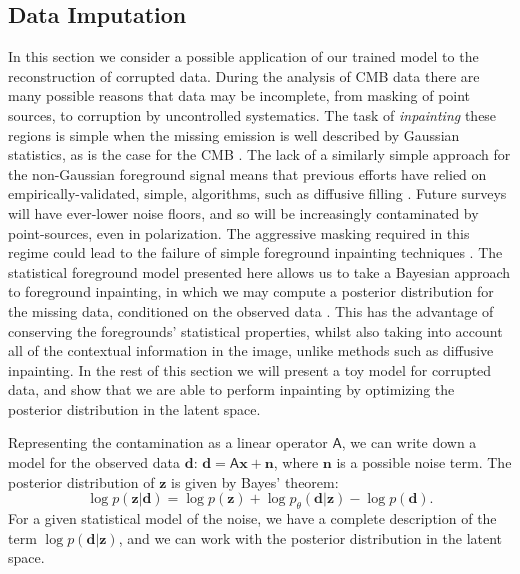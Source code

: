 \documentclass[fleqn,usenatbib]{mnras}
\begin{document}
\subsection{Data Imputation}
\label{sec:imputation} 
In this section we consider a possible application of our trained model to the reconstruction of corrupted data. During the analysis of CMB data there are many possible reasons that data may be incomplete, from masking of point sources, to corruption by uncontrolled systematics. The task of \emph{inpainting} these regions is simple when the missing emission is well described by Gaussian statistics, as is the case for the CMB \citep{bucher/louis:2012}. The lack of a similarly simple approach for the non-Gaussian foreground signal means that previous efforts have relied on empirically-validated, simple, algorithms, such as diffusive filling \citep{bucher/etal:2016}. Future surveys will have ever-lower noise floors, and so will be increasingly contaminated by point-sources, even in polarization. The aggressive masking required in this regime could lead to the failure of simple foreground inpainting techniques \citep{puglisi/bai:2020}. The statistical foreground model presented here allows us to take a Bayesian approach to foreground inpainting, in which we may compute a posterior distribution for the missing data, conditioned on the observed data \citep{bohm/seljak:2019}. This has the advantage of conserving the foregrounds' statistical properties, whilst also taking into account all of the contextual information in the image, unlike methods such as diffusive inpainting. In the rest of this section we will present a toy model for corrupted data, and show that we are able to perform inpainting by optimizing the posterior distribution in the latent space.

Representing the contamination as a linear operator $\mathsf A$, we can write down a model for the observed data $\mathbf d$: $\mathbf d = \mathsf A \mathbf x + \mathbf n$, where $\mathbf n$ is a possible noise term. The posterior distribution of $\mathbf z$ is given by Bayes' theorem:
\begin{equation}
    \log p(\mathbf z | \mathbf d) = \log p(\mathbf z) + \log p_\theta(\mathbf d | \mathbf z) - \log p(\mathbf d).
\end{equation}
For a given statistical model of the noise, we have a complete description of the term $\log p(\mathbf d | \mathbf z)$, and we can work with the posterior distribution in the latent space. 
\end{document}
